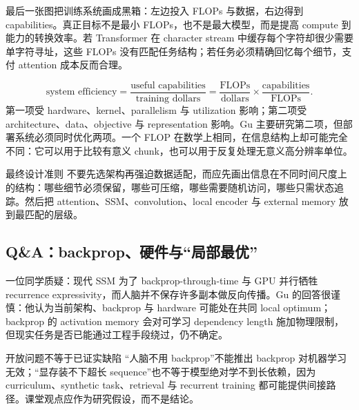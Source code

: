 最后一张图把训练系统画成黑箱：左边投入 FLOPs 与数据，右边得到 capabilities。真正目标不是最小 FLOPs，也不是最大模型，而是提高 compute 到能力的转换效率。若 Transformer 在 character stream 中缓存每个字符却很少需要单字符寻址，这些 FLOPs 没有匹配任务结构；若任务必须精确回忆每个细节，支付 attention 成本反而合理。


\[
\text{system efficiency}
=\frac{\text{useful capabilities}}{\text{training dollars}}
=\frac{\text{FLOPs}}{\text{dollars}}
\times
\frac{\text{capabilities}}{\text{FLOPs}}.
\]
第一项受 hardware、kernel、parallelism 与 utilization 影响；第二项受 architecture、data、objective 与 representation 影响。Gu 主要研究第二项，但部署系统必须同时优化两项。一个 FLOP 在数学上相同，在信息结构上却可能完全不同：它可以用于比较有意义 chunk，也可以用于反复处理无意义高分辨率单位。

\begin{importantbox}{最终设计准则}
不要先选架构再强迫数据适配，而应先画出信息在不同时间尺度上的结构：哪些细节必须保留，哪些可压缩，哪些需要随机访问，哪些只需状态追踪。然后把 attention、SSM、convolution、local encoder 与 external memory 放到最匹配的层级。
\end{importantbox}

\subsection{Q\&A：backprop、硬件与“局部最优”}

一位同学质疑：现代 SSM 为了 backprop-through-time 与 GPU 并行牺牲 recurrence expressivity，而人脑并不保存许多副本做反向传播。Gu 的回答很谨慎：他认为当前架构、backprop 与 hardware 可能处在共同 local optimum；backprop 的 activation memory 会对可学习 dependency length 施加物理限制，但现实任务是否已能通过工程手段绕过，仍不确定。


\begin{warningbox}{开放问题不等于已证实缺陷}
“人脑不用 backprop”不能推出 backprop 对机器学习无效；“显存装不下超长 sequence”也不等于模型绝对学不到长依赖，因为 curriculum、synthetic task、retrieval 与 recurrent training 都可能提供间接路径。课堂观点应作为研究假设，而不是结论。
\end{warningbox}

